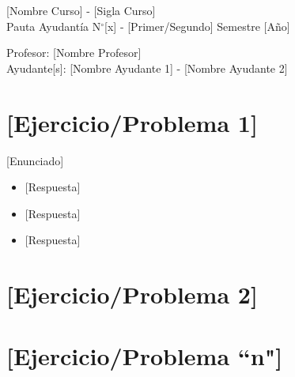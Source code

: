\documentclass[letterpaper,11pt,oneside]{article}
\newcommand{\grad}{$^{\circ}$}
\begin{document}
	\begin{center}
		{\Large [Nombre Curso] - [Sigla Curso]}\\
		{\large Pauta Ayudantía N\grad [x] - [Primer/Segundo] Semestre [Año]}
	\end{center}

	\begin{center}
		Profesor: [Nombre Profesor]\\
		Ayudante[s]: [Nombre Ayudante 1] - [Nombre Ayudante 2]
	\end{center}

\section*{[Ejercicio/Problema 1]}

[Enunciado]

\begin{itemize}
    \item[a)] [Pregunta]
    
    [Respuesta]
    
    \item[b)] [Pregunta]
    
    [Respuesta]
    
    \item[``n")] [Pregunta]
    
    [Respuesta]
\end{itemize}

\section*{[Ejercicio/Problema 2]}

\section*{[Ejercicio/Problema ``n"]}
\end{document}
